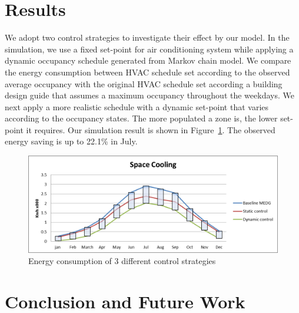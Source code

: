\documentclass{sig-alternate}
\begin{document}
\section{Results}
\label{sec:results}
We adopt two control strategies to investigate their effect by our
model. In the simulation, we use a fixed set-point for air
conditioning system while applying a dynamic occupancy schedule
generated from Markov chain model. We compare the energy consumption
between HVAC schedule set according to the observed average occupancy
with the original HVAC schedule set according a building design guide
that assumes a maximum occupancy throughout the weekdays. We next
apply a more realistic schedule with a dynamic set-point that varies
according to the occupancy states. The more populated a zone is, the
lower set-point it requires. Our simulation result is shown in
Figure~\ref{fig:energy-consumption}. The observed energy saving is up
to 22.1\% in July.  



\begin{figure}[!tb]
  \hspace{-20pt}
  \includegraphics[scale=0.5]{sc}
  \caption{Energy consumption of 3 different control strategies}
  \label{fig:energy-consumption}
\end{figure}









\section{Conclusion and Future Work}
\label{sec:concl-future-work}
\end{document}
